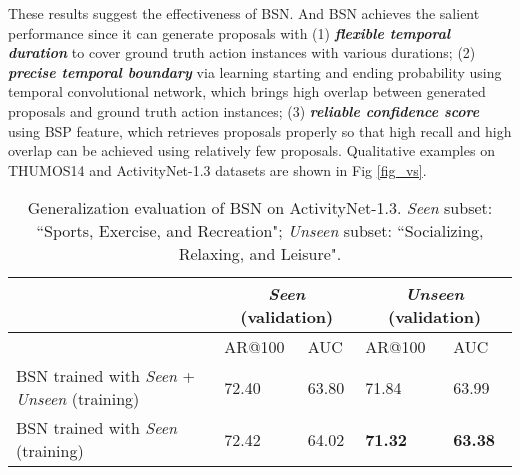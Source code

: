 \documentclass[runningheads]{llncs}
\begin{document}

These results suggest the effectiveness of BSN. And BSN achieves the salient performance since it can generate proposals with (1) {\bf \emph{flexible temporal duration}} to cover ground truth action instances with various durations; (2) {\bf \emph{precise temporal boundary}} via learning starting and ending probability using temporal convolutional network, which brings high overlap between generated proposals and ground truth action instances; (3) {\bf \emph{reliable confidence score}} using BSP feature, which retrieves proposals properly so that high recall and high overlap can be achieved using relatively few proposals.
%
Qualitative examples on  THUMOS14 and ActivityNet-1.3 datasets are shown in Fig \ref{fig_vs}.

\begin{table}[tbp]
\centering
\caption{  Generalization evaluation of BSN on ActivityNet-1.3. \emph{Seen} subset: ``Sports, Exercise, and Recreation";  \emph{Unseen} subset: ``Socializing, Relaxing, and Leisure".  }
\begin{tabular}{m{5.5cm}m{1.5cm}<{\centering}m{1.5cm}<{\centering}m{1.5cm}<{\centering}m{1.5cm}<{\centering}}
\toprule
 & \multicolumn{2}{c}{\emph{Seen} (validation)} & \multicolumn{2}{c}{\emph{Unseen} (validation)}  \\
\hline   &  AR@100  & AUC & AR@100 & AUC \\
\hline
BSN trained with \emph{Seen} + \emph{Unseen} (training)  	&  72.40  & 63.80 & 71.84 & 63.99 \\
BSN trained with \emph{Seen} (training)   			&  72.42  & 64.02 & {\bf 71.32}   & {\bf 63.38} \\
\bottomrule
\end{tabular}
\label{table_gene}
\vspace{-0.6cm}
\end{table}
\end{document}
